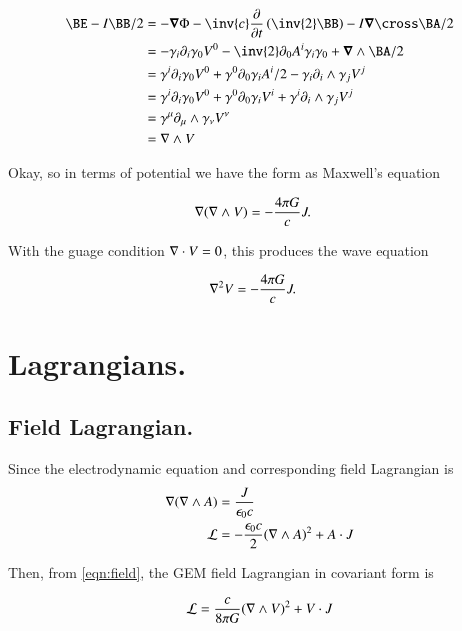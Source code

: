 \documentclass{article}
\begin{document}
\begin{align*}
\BE - I\BB/2 
&= - \spacegrad \Phi -\inv{c} \PD{t}{}\left( \inv{2} \BB \right) - I\spacegrad \cross \BA/2 \\
&= - \gamma_i \partial_i \gamma_0 V^0 - \inv{2} \partial_0 A^i \gamma_i \gamma_0 + \spacegrad \wedge \BA/2 \\
&= \gamma^i \partial_i \gamma_0 V^0 + \gamma^0 \partial_0 \gamma_i A^i/2 - \gamma_i \partial_i \wedge \gamma_j V^j \\
&= \gamma^i \partial_i \gamma_0 V^0 + \gamma^0 \partial_0 \gamma_i V^i + \gamma^i \partial_i \wedge \gamma_j V^j \\
&= \gamma^\mu \partial_\mu \wedge \gamma_\nu V^\nu \\
&= \grad \wedge V
\end{align*}

Okay, so in terms of potential we have the form as Maxwell's equation

\begin{align}\label{eqn:field}
\nabla (\nabla \wedge V) &= -\frac{4\pi G}{c} J.
\end{align}

With the guage condition $\nabla \cdot V = 0$, this produces the wave equation

\begin{align}
\nabla^2 V &= -\frac{4\pi G}{c} J.
\end{align}

\section{ Lagrangians. }

\subsection{ Field Lagrangian. }

Since the electrodynamic equation and corresponding field Lagrangian is
\begin{align*}
\nabla (\nabla \wedge A) &= \frac{J}{\epsilon_0 c} \\
\mathcal{L} &= -\frac{\epsilon_0 c}{2} (\nabla \wedge A)^2 + A \cdot J
\end{align*}

Then, from \ref{eqn:field}, the GEM field Lagrangian in covariant form is

\begin{align*}
\mathcal{L} &= \frac{c}{8 \pi G} (\nabla \wedge V)^2 + V \cdot J \\
\end{align*}
\end{document}
